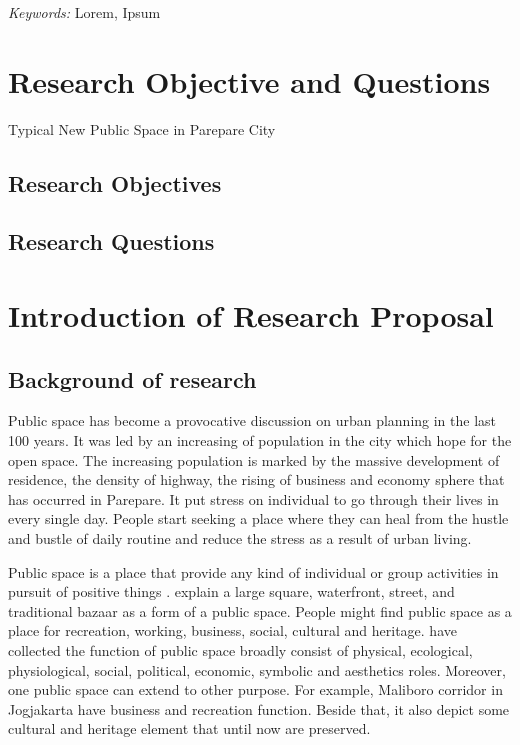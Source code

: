 \documentclass[11pt]{simart} %
\begin{document}
\hspace*{3.6mm}\textit{Keywords:} Lorem, Ipsum %

\vspace{30pt} %

\section{Research Objective and Questions}
Typical New Public Space in Parepare City

\subsection{Research Objectives}

\subsection{Research Questions}



\section{Introduction of Research Proposal}

\subsection{Background of research}

Public space has become a provocative discussion on urban planning in the last 100 years. It was led by an increasing of population in the city which hope for the open space.
The increasing population is marked by the massive development of residence, the density of highway, the rising of business and economy sphere that has occurred in Parepare. It put stress on individual to go through their lives in every single day. People start seeking a place where they can heal from the hustle and bustle of daily routine and reduce the stress as a result of urban living.

Public space is a place that provide any kind of individual or group  activities in pursuit of positive things \citep{sadat2012}.\cite{sadat2012} explain a large square, waterfront, street, and traditional bazaar as a form of a public space.
People might find public space as a place for recreation, working, business, social, cultural and heritage. \cite{sadat2012,akkar2007} have collected the function of public space broadly consist of physical, ecological, physiological, social, political, economic, symbolic and aesthetics roles.
Moreover, one public space can extend to other purpose. For example, Maliboro corridor in Jogjakarta have business and recreation function. Beside that, it also depict some cultural and heritage element that until now are preserved.
\end{document}
